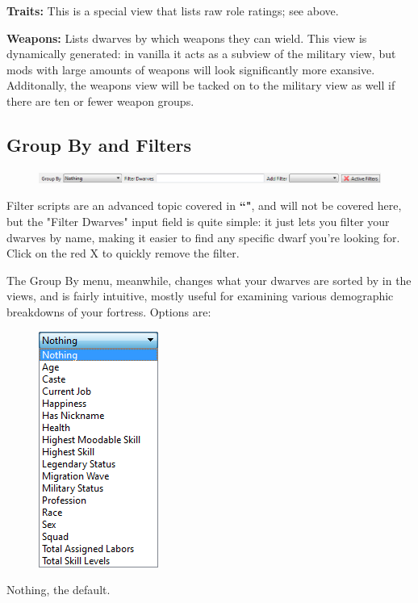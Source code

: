 \documentclass[]{article}
\begin{document}
\noindent\textbf{Traits:} This is a special view that lists raw role ratings; see above.


\noindent\textbf{Weapons:} Lists dwarves by which weapons they can wield. This view is dynamically
generated: in vanilla it acts as a subview of the military view, but mods with large amounts of weapons
will look significantly more exansive. Additonally, the weapons view will be tacked on to the military
view as well if there are ten or fewer weapon groups.
\newpage

\subsection{Group By and Filters}
\label{sec:Group By and Filters}
\begin{figure}[h!]
\centering
\includegraphics[width=\linewidth]{Sec1Fig11}
\end{figure}

Filter scripts are an advanced topic covered in  \textbf{``"}, and will not
be covered here, but the "Filter Dwarves" input field is quite simple: it just lets you filter your
dwarves by name, making it easier to find any specific dwarf  you're looking for. Click on the red X to
quickly remove the filter.

The Group By menu, meanwhile, changes what your dwarves are sorted by in the views, and is fairly
intuitive, mostly useful for examining various demographic breakdowns of your fortress. Options are:
\vspace{12pt}

\begin{figure}
\begin{center}
\includegraphics[scale=.75]{Sec1Fig11+.png}
\vspace{-20pt}
\end{center}
\end{figure}
\noindent Nothing, the default.
\end{document}
